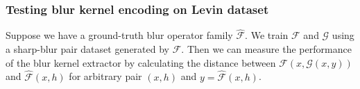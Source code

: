 \documentclass[final]{cvpr}
\newcommand{\anh}[1]{{\textcolor{cyan}{[Anh: #1]}}}
\begin{document}
\subsubsection{Testing blur kernel encoding on Levin dataset}

Suppose we have a ground-truth blur operator family $\hat{\mathcal{F}}$. We train $\mathcal{F}$ and $\mathcal{G}$ using a sharp-blur pair dataset generated by $\hat{\mathcal{F}}$. Then we can measure the performance of the blur kernel extractor by calculating the distance between $\mathcal{F}(x, \mathcal{G}(x, y))$ and $\hat{\mathcal{F}}(x, h)$ for arbitrary pair $(x, h)$ and $y = \hat{\mathcal{F}}(x, h)$. 
\end{document}
